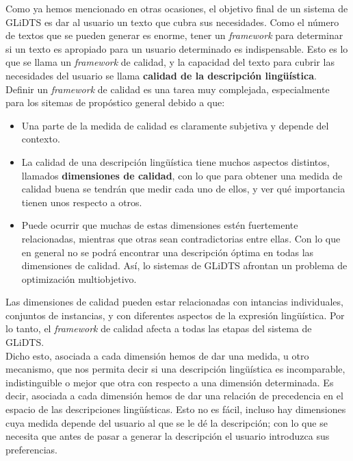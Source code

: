 \documentclass[10pt,a4paper]{article}
\begin{document}
Como ya hemos mencionado en otras ocasiones, el objetivo final de un sistema de GLiDTS es dar al usuario un texto que cubra sus necesidades. Como el número de textos que se pueden generar es enorme, tener un \textit{framework} para determinar si un texto es apropiado para un usuario determinado es indispensable. Esto es lo que se llama un \textit{framework} de calidad, y la capacidad del texto para cubrir las necesidades del usuario se llama \textbf{calidad de la descripción lingüística}.\\

Definir un \textit{framework} de calidad es una tarea muy complejada, especialmente para los sitemas de propóstico general debido a que:

\begin{itemize}
\item Una parte de la medida de calidad es claramente subjetiva y depende del contexto.
\item La calidad de una descripción lingüística tiene muchos aspectos distintos, llamados \textbf{dimensiones de calidad}, con lo que para obtener una medida de calidad buena se tendrán que medir cada uno de ellos, y ver qué importancia tienen unos respecto a otros.
\item Puede ocurrir que muchas de estas dimensiones estén fuertemente relacionadas, mientras que otras sean contradictorias entre ellas. Con lo que en general no se podrá encontrar una descripción óptima en todas las dimensiones de calidad. Así, lo sistemas de GLiDTS afrontan un problema de optimización multiobjetivo.
\end{itemize}

Las dimensiones de calidad pueden estar relacionadas con intancias individuales, conjuntos de instancias, y con diferentes aspectos de la expresión lingüística. Por lo tanto, el \textit{framework} de calidad afecta a todas las etapas del sistema de GLiDTS.\\

Dicho esto, asociada a cada dimensión hemos de dar una medida, u otro mecanismo, que nos permita decir si una descripción lingüística es incomparable, indistinguible o mejor que otra con respecto a una dimensión determinada. Es decir, asociada a cada dimensión hemos de dar una relación de precedencia en el espacio de las descripciones lingüísticas. Esto no es fácil, incluso hay dimensiones cuya medida depende del usuario al que se le dé la descripción; con lo que se necesita que antes de pasar a generar la descripción el usuario introduzca sus preferencias.
\end{document}
